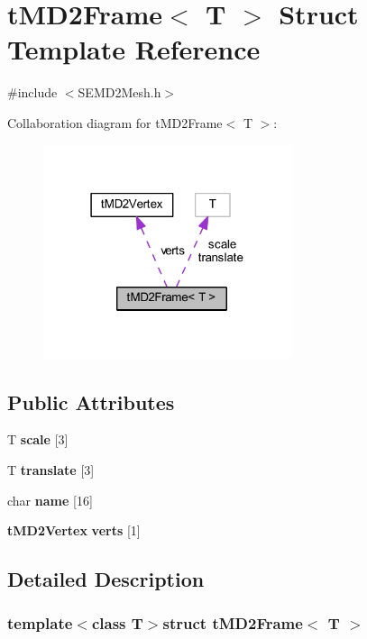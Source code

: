 \section{t\+M\+D2\+Frame$<$ T $>$ Struct Template Reference}
\label{structt_m_d2_frame}


{\ttfamily \#include $<$S\+E\+M\+D2\+Mesh.\+h$>$}



Collaboration diagram for t\+M\+D2\+Frame$<$ T $>$\+:
\nopagebreak
\begin{figure}[H]
\begin{center}
\leavevmode
\includegraphics[width=207pt]{structt_m_d2_frame__coll__graph}
\end{center}
\end{figure}
\subsection*{Public Attributes}
\begin{DoxyCompactItemize}
\item 
T {\bf scale} [3]
\item 
T {\bf translate} [3]
\item 
char {\bf name} [16]
\item 
{\bf t\+M\+D2\+Vertex} {\bf verts} [1]
\end{DoxyCompactItemize}


\subsection{Detailed Description}
\subsubsection*{template$<$class T$>$struct t\+M\+D2\+Frame$<$ T $>$}



